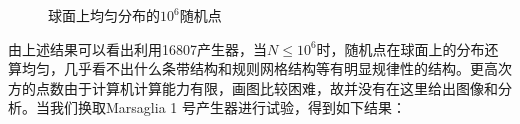 \documentclass[a4paper,11pt]{article}
\begin{document}
\begin{figure}[!htbp]   
\centering     
{}
\caption{球面上均匀分布的$10^{6}$随机点}      
\end{figure}

\newpage
 由上述结果可以看出利用16807产生器，当$N \leq 10^{6}$时，随机点在球面上的分布还算均匀，几乎看不出什么条带结构和规则网格结构等有明显规律性的结构。更高次方的点数由于计算机计算能力有限，画图比较困难，故并没有在这里给出图像和分析。当我们换取Marsaglia 1 号产生器进行试验，得到如下结果：
\end{document}
